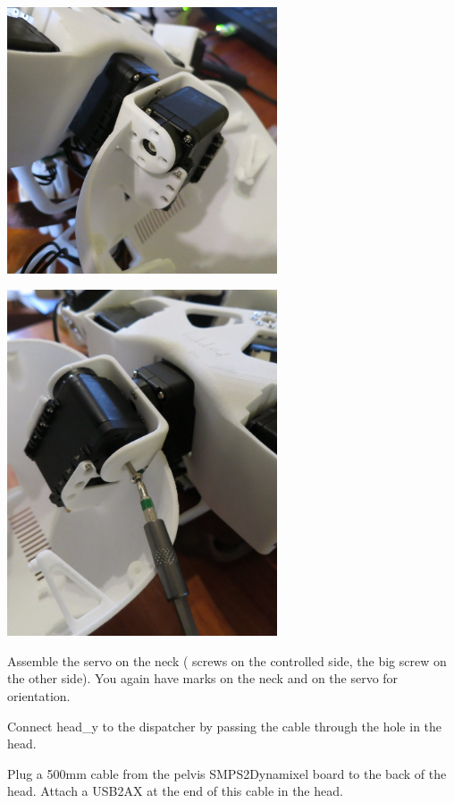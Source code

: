 \documentclass{article}
\begin{document}
  \begin{center}
  \includegraphics[width=0.6\textwidth]{img/neck3}
 \end{center}

  \begin{center}
  \includegraphics[width=0.6\textwidth]{img/neck4}\\
 \end{center}

Assemble the servo on the neck ( screws on the controlled side, the big screw on the other side). You again have marks on the neck and on the servo for orientation.

Connect head\_y to the dispatcher by passing the cable through the hole in the head.

Plug a 500mm cable from the pelvis SMPS2Dynamixel board to the back of the head. Attach a USB2AX at the end of this cable in the head.
\end{document}
